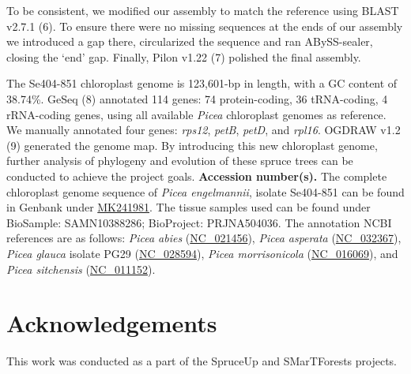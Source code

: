 \documentclass[titlepage,11pt, oneside]{article}   	%
\begin{document}
\par
To be consistent, we modified our assembly to match the reference using BLAST v2.7.1 (6). To ensure there were no missing sequences at the ends of our assembly we introduced a gap there, circularized the sequence and ran ABySS-sealer, closing the ‘end’ gap. Finally, Pilon v1.22 (7) polished the final assembly.
\newline
\par
The Se404-851 chloroplast genome is 123,601-bp in length, with a GC content of 38.74\%. GeSeq (8) annotated 114 genes: 74 protein-coding, 36 tRNA-coding, 4 rRNA-coding genes, using all available \textit{Picea} chloroplast genomes as reference. We manually annotated four genes: \textit{rps12}, \textit{petB}, \textit{petD}, and \textit{rpl16}. OGDRAW v1.2 (9) generated the genome map. By introducing this new chloroplast genome, further analysis of phylogeny and evolution of these spruce trees can be conducted to achieve the project goals.
\newline
\newline
\textbf{Accession number(s).} The complete chloroplast genome sequence of \textit{Picea engelmannii}, isolate Se404-851 can be found in Genbank under \href{https://www.ncbi.nlm.nih.gov/nuccore/MK241981}{MK241981}. The tissue samples used can be found under BioSample: SAMN10388286; BioProject: PRJNA504036. The annotation NCBI references are as follows: \textit{Picea abies} (\href{https://www.ncbi.nlm.nih.gov/nuccore/NC_021456}{NC\_021456}), \textit{Picea asperata} (\href{https://www.ncbi.nlm.nih.gov/nuccore/NC_032367}{NC\_032367}), \textit{Picea glauca} isolate PG29 (\href{https://www.ncbi.nlm.nih.gov/nuccore/NC_028594}{NC\_028594}), \textit{Picea morrisonicola} (\href{https://www.ncbi.nlm.nih.gov/nuccore/NC_016069}{NC\_016069}), and \textit{Picea sitchensis} (\href{https://www.ncbi.nlm.nih.gov/nuccore/NC_011152}{NC\_011152}).

\section*{Acknowledgements}
This work was conducted as a part of the SpruceUp and SMarTForests projects.
\end{document}
